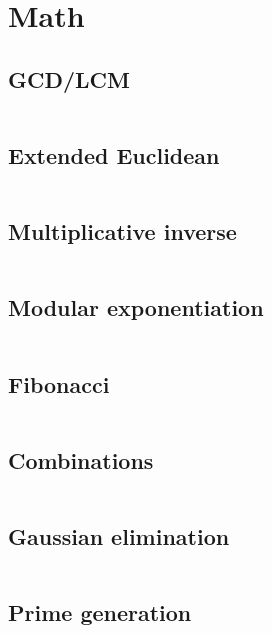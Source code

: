 \section{Math}
\subsection{GCD/LCM}
\inputminted[frame=single,framesep=3pt,tabsize=2,breaklines=true,linenos,label=O(log(K))]{c++}{math/gcd.cpp}

\subsection{Extended Euclidean}
\inputminted[frame=single,framesep=3pt,tabsize=2,breaklines=true,linenos,label=O(log(K))]{c++}{math/extgcd.cpp}

\subsection{Multiplicative inverse}
\inputminted[frame=single,framesep=3pt,tabsize=2,breaklines=true,linenos,label=O(log(K))]{c++}{math/mod-mult-inverse.cpp}

\subsection{Modular exponentiation}
\inputminted[frame=single,framesep=3pt,tabsize=2,breaklines=true,linenos,label=O(log(K))]{c++}{math/expmod.cpp}

\subsection{Fibonacci}
\inputminted[frame=single,framesep=3pt,tabsize=2,breaklines=true,linenos,label=O(N)]{c++}{math/fib.cpp}

\subsection{Combinations}
\inputminted[frame=single,framesep=3pt,tabsize=2,breaklines=true,linenos,label=O($N^2$)]{c++}{math/combinations.cpp}

\subsection{Gaussian elimination}
\inputminted[frame=single,framesep=3pt,breaklines=true,tabsize=2,linenos,label=O($N^3$)]{c++}{math/gaussian-elimination.cpp}

\subsection{Prime generation}
\inputminted[frame=single,framesep=3pt,tabsize=2,breaklines=true,linenos,label=O(N log(log(N)))]{c++}{math/prime-gen.cpp}

